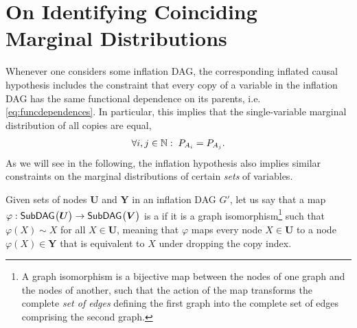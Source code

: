 \section{On Identifying Coinciding Marginal Distributions}\label{sec:coincidingdetails}



Whenever one considers some inflation DAG, the corresponding inflated causal hypothesis includes the constraint that every copy of a variable in the inflation DAG has the same functional dependence on its parents, i.e. \cref{eq:funcdependences}. In particular, this implies that the single-variable marginal distribution of all copies are equal,
\begin{align}
     \forall i,j \in \mathbb{N}:\; P_{A_i}=P_{A_j}.
\end{align}
As we will see in the following, the inflation hypothesis also implies similar constraints on the marginal distributions of certain \emph{sets} of variables.

Given sets of nodes $\bm{U}$ and $\bm{Y}$ in an inflation DAG $G'$, let us say that a map $\varphi:{\operatorname{\mathsf{SubDAG}}_{}}\bigl\lparen\bm{U}\bigr\rparen\to{\operatorname{\mathsf{SubDAG}}_{}}\bigl\lparen\bm{V}\bigr\rparen$ is a  if it is a graph isomorphism\footnote{A graph isomorphism is a bijective map between the nodes of one graph and the nodes of another, such that the action of the map transforms the complete \emph{set of edges} defining the first graph into the complete set of edges comprising the second graph.} such that $\varphi(X)\sim X$ for all $X\in\bm{U}$, meaning that $\varphi$ maps every node $X\in\bm{U}$ to a node $\varphi(X)\in\bm{Y}$ that is equivalent to $X$ under dropping the copy index. %

